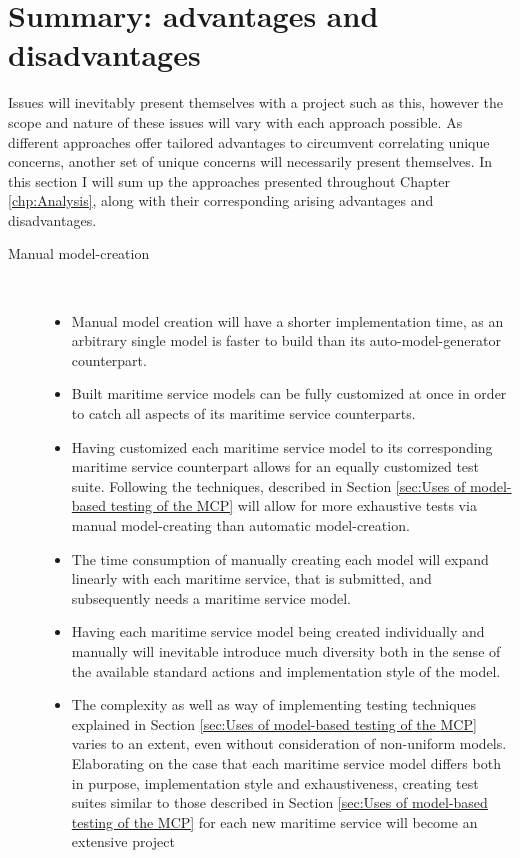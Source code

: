 \section{Summary: advantages and disadvantages} 

Issues will inevitably present themselves with a project such as this, however the scope and nature of these issues will vary with each approach possible. As different approaches offer tailored advantages to circumvent correlating unique concerns, another set of unique concerns will necessarily present themselves. In this section I will sum up the approaches presented throughout Chapter \ref{chp:Analysis}, along with their corresponding arising advantages and disadvantages.
\begin{description}
	\item[Manual model-creation]\ \\
		\begin{itemize}
			\item Manual model creation will have a shorter implementation time, as an arbitrary single model is faster to build than its auto-model-generator counterpart. 
			\item Built maritime service models can be fully customized at once in order to catch all aspects of its maritime service counterparts.
			\item Having customized each maritime service model to its corresponding maritime service counterpart allows for an equally customized test suite. Following the techniques, described in Section \ref{sec:Uses of model-based testing of the MCP} will allow for more exhaustive tests via manual model-creating than automatic model-creation.
		\end{itemize}
		\begin{itemize}
			\item The time consumption of manually creating each model will expand linearly with each maritime service, that is submitted, and subsequently needs a maritime service model. 
			\item Having each maritime service model being created individually and manually will inevitable introduce much diversity both in the sense of the available standard actions and implementation style of the model.
			\item The complexity as well as way of implementing testing techniques explained in Section \ref{sec:Uses of model-based testing of the MCP} varies to an extent, even without consideration of non-uniform models. Elaborating on the case that each maritime service model differs both in purpose, implementation style and exhaustiveness, creating test suites similar to those described in Section \ref{sec:Uses of model-based testing of the MCP} for each new maritime service will become an extensive project

\end{itemize}
\end{description}
